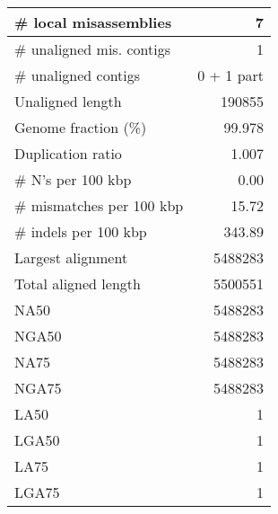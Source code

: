 \documentclass[12pt,a4paper]{article}
\begin{document}
\begin{table}[ht]
\begin{center}
\begin{tabular}{|l*{1}{|r}|}
\# local misassemblies & 7 \\ \hline
\# unaligned mis. contigs & 1 \\ \hline
\# unaligned contigs & 0 + 1 part \\ \hline
Unaligned length & 190855 \\ \hline
Genome fraction (\%) & 99.978 \\ \hline
Duplication ratio & 1.007 \\ \hline
\# N's per 100 kbp & 0.00 \\ \hline
\# mismatches per 100 kbp & 15.72 \\ \hline
\# indels per 100 kbp & 343.89 \\ \hline
Largest alignment & 5488283 \\ \hline
Total aligned length & 5500551 \\ \hline
NA50 & 5488283 \\ \hline
NGA50 & 5488283 \\ \hline
NA75 & 5488283 \\ \hline
NGA75 & 5488283 \\ \hline
LA50 & 1 \\ \hline
LGA50 & 1 \\ \hline
LA75 & 1 \\ \hline
LGA75 & 1 \\ \hline
\end{tabular}
\end{center}
\end{table}
\end{document}

